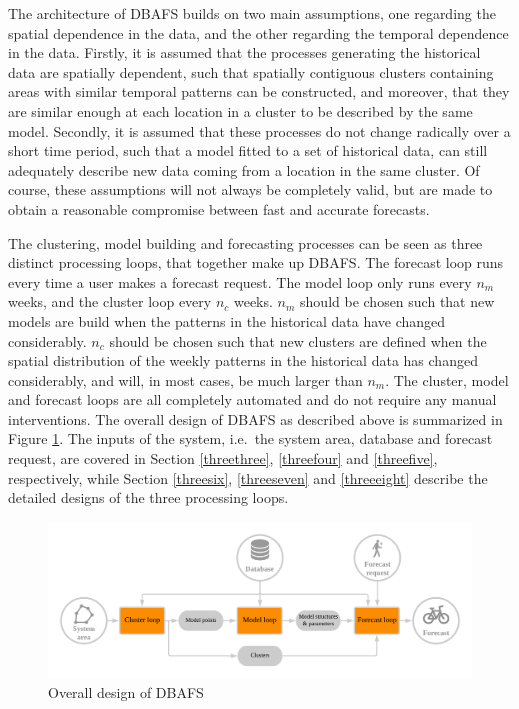 \documentclass[12pt,oneside]{reedthesis}
\begin{document}
The architecture of DBAFS builds on two main assumptions, one regarding
the spatial dependence in the data, and the other regarding the temporal
dependence in the data. Firstly, it is assumed that the processes
generating the historical data are spatially dependent, such that
spatially contiguous clusters containing areas with similar temporal
patterns can be constructed, and moreover, that they are similar enough
at each location in a cluster to be described by the same model.
Secondly, it is assumed that these processes do not change radically
over a short time period, such that a model fitted to a set of
historical data, can still adequately describe new data coming from a
location in the same cluster. Of course, these assumptions will not
always be completely valid, but are made to obtain a reasonable
compromise between fast and accurate forecasts.

The clustering, model building and forecasting processes can be seen as
three distinct processing loops, that together make up DBAFS. The
forecast loop runs every time a user makes a forecast request. The model
loop only runs every \(n_{m}\) weeks, and the cluster loop every
\(n_{c}\) weeks. \(n_{m}\) should be chosen such that new models are
build when the patterns in the historical data have changed
considerably. \(n_{c}\) should be chosen such that new clusters are
defined when the spatial distribution of the weekly patterns in the
historical data has changed considerably, and will, in most cases, be
much larger than \(n_{m}\). The cluster, model and forecast loops are
all completely automated and do not require any manual interventions.
The overall design of DBAFS as described above is summarized in Figure
\ref{fig:overalldesign}. The inputs of the system, i.e.~the system area,
database and forecast request, are covered in Section \ref{threethree},
\ref{threefour} and \ref{threefive}, respectively, while Section
\ref{threesix}, \ref{threeseven} and \ref{threeeight} describe the
detailed designs of the three processing loops.
\begin{figure}[h]
\includegraphics[width=\textwidth]{Figures/Workflow} \caption{Overall design of DBAFS}\label{fig:overalldesign}
\end{figure}
\end{document}
